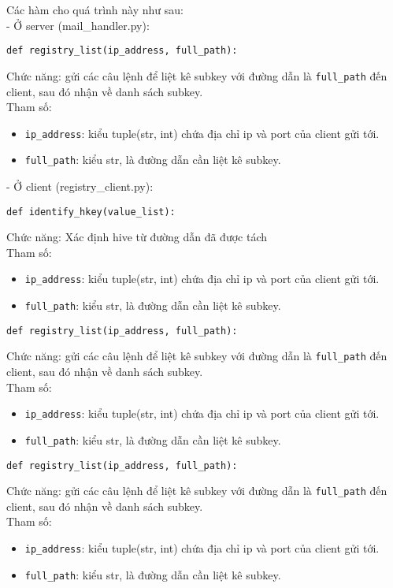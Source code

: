 Các hàm cho quá trình này như sau:\\
- Ở server (mail_handler.py):\\

\begin{lstlisting}
def registry_list(ip_address, full_path):
\end{lstlisting}
Chức năng: gửi các câu lệnh để liệt kê subkey với đường dẫn là \lstinline{full_path} đến client, sau đó nhận về danh sách subkey.\\
Tham số: 
\begin{itemize}
\item \lstinline{ip_address}: kiểu tuple(str, int) chứa địa chỉ ip và port của client gửi tới.
\item \lstinline{full_path}: kiểu str, là đường dẫn cần liệt kê subkey.
\end{itemize}

- Ở client (registry_client.py):\\

\begin{lstlisting}
def identify_hkey(value_list):
\end{lstlisting}
Chức năng: Xác định hive từ đường dẫn đã được tách\\
Tham số: 
\begin{itemize}
\item \lstinline{ip_address}: kiểu tuple(str, int) chứa địa chỉ ip và port của client gửi tới.
\item \lstinline{full_path}: kiểu str, là đường dẫn cần liệt kê subkey.
\end{itemize}

\begin{lstlisting}
def registry_list(ip_address, full_path):
\end{lstlisting}
Chức năng: gửi các câu lệnh để liệt kê subkey với đường dẫn là \lstinline{full_path} đến client, sau đó nhận về danh sách subkey.\\
Tham số: 
\begin{itemize}
\item \lstinline{ip_address}: kiểu tuple(str, int) chứa địa chỉ ip và port của client gửi tới.
\item \lstinline{full_path}: kiểu str, là đường dẫn cần liệt kê subkey.
\end{itemize}

\begin{lstlisting}
def registry_list(ip_address, full_path):
\end{lstlisting}
Chức năng: gửi các câu lệnh để liệt kê subkey với đường dẫn là \lstinline{full_path} đến client, sau đó nhận về danh sách subkey.\\
Tham số: 
\begin{itemize}
\item \lstinline{ip_address}: kiểu tuple(str, int) chứa địa chỉ ip và port của client gửi tới.
\item \lstinline{full_path}: kiểu str, là đường dẫn cần liệt kê subkey.
\end{itemize}

